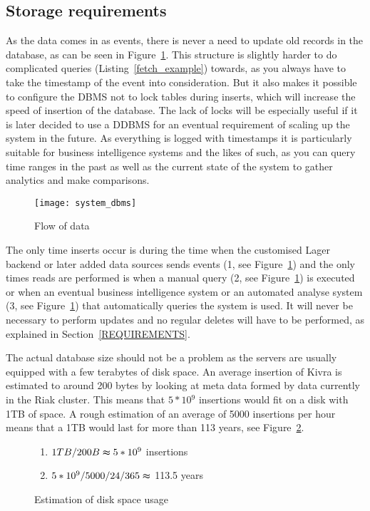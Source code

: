 \documentclass[a4paper,12pt]{article}
\begin{document}
\newpage
\subsection{Storage requirements}
As the data comes in as events, there is never a need to update old records in the database, as can be seen in Figure~\ref{fig:storage}. This structure is slightly harder to do complicated 
queries (Listing~\ref{fetch_example}) towards, as you always have to take the timestamp of the event into consideration. 
But it also makes it possible to configure the DBMS not to lock tables during inserts, which will increase the speed of insertion of the database. The lack of locks will be especially useful if it is later 
decided to use a DDBMS for an eventual requirement of scaling up the system in the future. As everything is logged with timestamps it is particularly suitable for business intelligence systems and the likes of such, as you can query 
time ranges in the past as well as the current state of the system to gather analytics and make comparisons. 

\begin{figure}[h!]
    \vspace{0.25in}
    \centerline{\texttt{[image: system\_dbms]}}
    \caption{Flow of data}
    \label{fig:storage}
\end{figure}

The only time inserts occur is during the time when the customised Lager~\cite{LAGER} backend or later added data sources sends events (1, see Figure~\ref{fig:storage}) and the only times reads are performed 
is when a manual query (2, see Figure~\ref{fig:storage}) is executed or when an eventual business intelligence system or an automated analyse system (3, see Figure~\ref{fig:storage}) that automatically queries the system is used. 
It will never be necessary to perform updates and no regular deletes will have to be performed, as explained in Section~\ref{REQUIREMENTS}.

The actual database size should not be a problem as the servers are usually equipped with a few terabytes of disk space. An average insertion of Kivra is estimated to around 200 bytes by looking at meta data formed by data currently in the Riak cluster.
This means that $5*10{^9}$ insertions would fit on a disk with 1TB of space. A rough estimation of an average of 5000 insertions per hour means that a 1TB would last for more than 113 years, see Figure~\ref{fig:storage2}.

\begin{figure}[h!]
\begin{framed}
\begin{enumerate}
\item $1TB/200B \thickapprox 5*10^{9}$ insertions
\item $5*10^{9}/5000/24/365 \thickapprox $ 113.5 years
\end{enumerate}
\end{framed}
\caption{Estimation of disk space usage}
\label{fig:storage2}
\end{figure}
\end{document}
